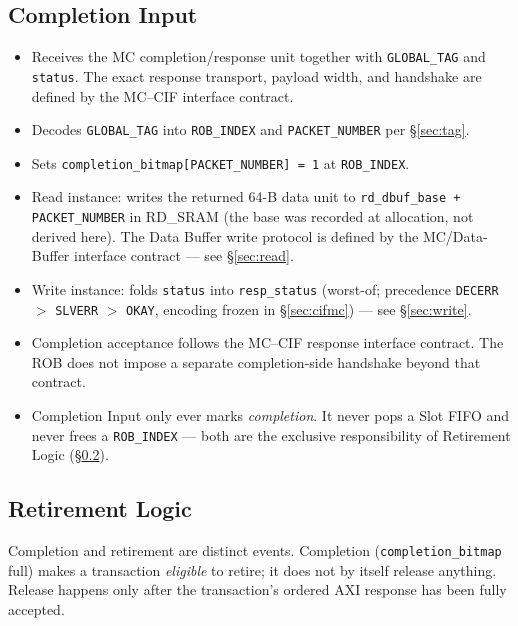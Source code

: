 \subsection{Completion Input}
\label{sec:compin}
\begin{itemize}[noitemsep]
  \item Receives the MC completion/response unit together with
      \texttt{GLOBAL\_TAG} and \texttt{status}. The exact response
      transport, payload width, and handshake are defined by the
      MC--CIF interface contract.
  \item Decodes \texttt{GLOBAL\_TAG} into \texttt{ROB\_INDEX} and \texttt{PACKET\_NUMBER} per \S\ref{sec:tag}.
  \item Sets \texttt{completion\_bitmap[PACKET\_NUMBER] = 1} at \texttt{ROB\_INDEX}.
  \item Read instance: writes the returned 64-B data unit to \texttt{rd\_dbuf\_base + PACKET\_NUMBER} in RD\_SRAM (the base was recorded at allocation, not derived here).  The Data Buffer write protocol is defined by the MC/Data-Buffer interface contract --- see \S\ref{sec:read}.
  \item Write instance: folds \texttt{status} into \texttt{resp\_status} (worst-of; precedence \texttt{DECERR} $>$ \texttt{SLVERR} $>$ \texttt{OKAY}, encoding frozen in \S\ref{sec:cifmc}) --- see \S\ref{sec:write}.
  \item Completion acceptance follows the MC--CIF response interface
      contract. The ROB does not impose a separate completion-side
      handshake beyond that contract.
  \item Completion Input only ever marks \emph{completion}. It never pops a Slot FIFO and never frees a \texttt{ROB\_INDEX} --- both are the exclusive responsibility of Retirement Logic (\S\ref{sec:retire}).
\end{itemize}

\subsection{Retirement Logic}
\label{sec:retire}

Completion and retirement are distinct events. Completion (\texttt{completion\_bitmap} full) makes a transaction \emph{eligible} to retire; it does not by itself release anything. Release happens only after the transaction's ordered AXI response has been fully accepted.

